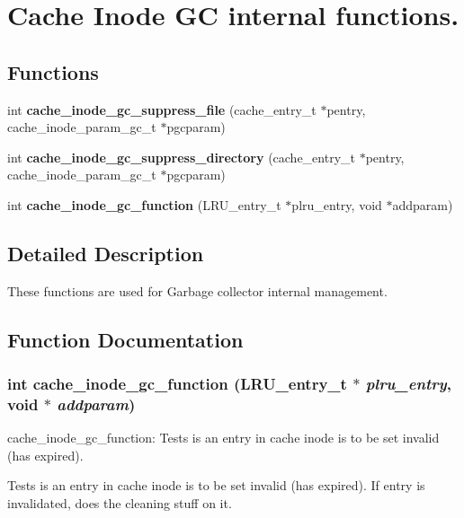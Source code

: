 \section{Cache Inode GC internal functions.}
\label{group__Cache__inode__gc__internal}
\subsection*{Functions}
\begin{DoxyCompactItemize}
\item 
int {\bf cache\_\-inode\_\-gc\_\-suppress\_\-file} (cache\_\-entry\_\-t $\ast$pentry, cache\_\-inode\_\-param\_\-gc\_\-t $\ast$pgcparam)
\item 
int {\bf cache\_\-inode\_\-gc\_\-suppress\_\-directory} (cache\_\-entry\_\-t $\ast$pentry, cache\_\-inode\_\-param\_\-gc\_\-t $\ast$pgcparam)
\item 
int {\bf cache\_\-inode\_\-gc\_\-function} (LRU\_\-entry\_\-t $\ast$plru\_\-entry, void $\ast$addparam)
\end{DoxyCompactItemize}


\subsection{Detailed Description}
These functions are used for Garbage collector internal management. 

\subsection{Function Documentation}
\subsubsection[{cache\_\-inode\_\-gc\_\-function}]{\setlength{\rightskip}{0pt plus 5cm}int cache\_\-inode\_\-gc\_\-function (LRU\_\-entry\_\-t $\ast$ {\em plru\_\-entry}, \/  void $\ast$ {\em addparam})}\label{group__Cache__inode__gc__internal_ga1a749f9170eb28914650d29382b6ed81}
cache\_\-inode\_\-gc\_\-function: Tests is an entry in cache inode is to be set invalid (has expired).

Tests is an entry in cache inode is to be set invalid (has expired). If entry is invalidated, does the cleaning stuff on it.


